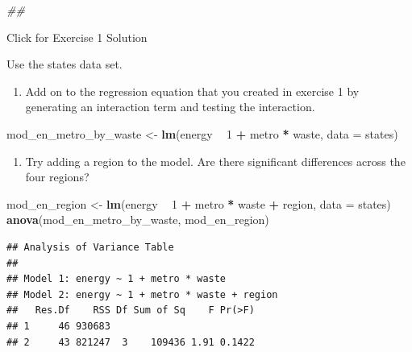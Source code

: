 \documentclass[]{book}
\newenvironment{Shaded}{\begin{snugshade}}{\end{snugshade}}
\newcommand{\CommentTok}[1]{\textcolor[rgb]{0.56,0.35,0.01}{\textit{#1}}}
\newcommand{\DataTypeTok}[1]{\textcolor[rgb]{0.13,0.29,0.53}{#1}}
\newcommand{\DecValTok}[1]{\textcolor[rgb]{0.00,0.00,0.81}{#1}}
\newcommand{\KeywordTok}[1]{\textcolor[rgb]{0.13,0.29,0.53}{\textbf{#1}}}
\newcommand{\NormalTok}[1]{#1}
\newcommand{\OperatorTok}[1]{\textcolor[rgb]{0.81,0.36,0.00}{\textbf{#1}}}
\newcommand{\StringTok}[1]{\textcolor[rgb]{0.31,0.60,0.02}{#1}}
\providecommand{\tightlist}{%
  \setlength{\itemsep}{0pt}\setlength{\parskip}{0pt}}
\begin{document}
\begin{Shaded}
\begin{Highlighting}[]
\CommentTok{## }
\end{Highlighting}
\end{Shaded}

{Click for Exercise 1 Solution}

Use the states data set.

\begin{enumerate}
\def\labelenumi{\arabic{enumi}.}
\tightlist
\item
  Add on to the regression equation that you created in exercise 1 by generating an interaction term and testing the interaction.
\end{enumerate}

\begin{Shaded}
\begin{Highlighting}[]
\NormalTok{  mod_en_metro_by_waste <-}\StringTok{ }\KeywordTok{lm}\NormalTok{(energy }\OperatorTok{~}\StringTok{ }\DecValTok{1} \OperatorTok{+}\StringTok{ }\NormalTok{metro }\OperatorTok{*}\StringTok{ }\NormalTok{waste, }\DataTypeTok{data =}\NormalTok{ states)}
\end{Highlighting}
\end{Shaded}

\begin{enumerate}
\def\labelenumi{\arabic{enumi}.}
\setcounter{enumi}{1}
\tightlist
\item
  Try adding a region to the model. Are there significant differences across the four regions?
\end{enumerate}

\begin{Shaded}
\begin{Highlighting}[]
\NormalTok{  mod_en_region <-}\StringTok{ }\KeywordTok{lm}\NormalTok{(energy }\OperatorTok{~}\StringTok{ }\DecValTok{1} \OperatorTok{+}\StringTok{ }\NormalTok{metro }\OperatorTok{*}\StringTok{ }\NormalTok{waste }\OperatorTok{+}\StringTok{ }\NormalTok{region, }\DataTypeTok{data =}\NormalTok{ states)}
  \KeywordTok{anova}\NormalTok{(mod_en_metro_by_waste, mod_en_region)}
\end{Highlighting}
\end{Shaded}

\begin{verbatim}
## Analysis of Variance Table
## 
## Model 1: energy ~ 1 + metro * waste
## Model 2: energy ~ 1 + metro * waste + region
##   Res.Df    RSS Df Sum of Sq    F Pr(>F)
## 1     46 930683                         
## 2     43 821247  3    109436 1.91 0.1422
\end{verbatim}
\end{document}
